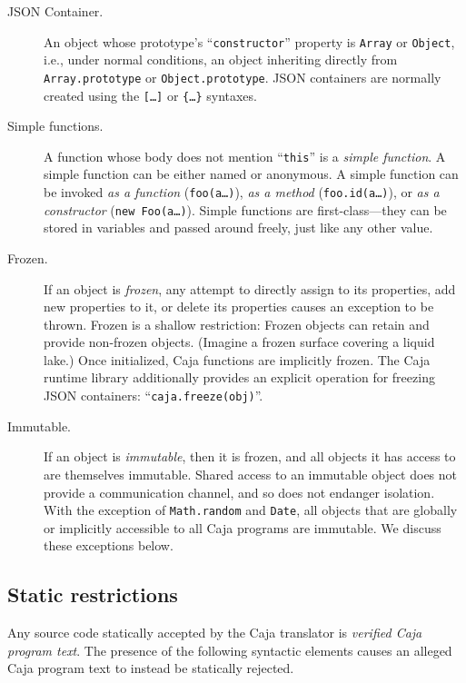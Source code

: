\documentclass[letterpaper,twocolumn,10pt]{article}
\newcommand{\code}[1]{{\tt {#1}}}              %
\begin{document}
\begin{description}

  \item[JSON Container.] An object whose prototype's ``\code{constructor}'' 
  property is \code{Array} or \code{Object}, i.e., under normal conditions, 
  an object inheriting directly from \code{Array.prototype} or 
  \code{Object.prototype}. JSON containers are normally created using the
  \code{[\ldots]} or \code{\{\ldots\}} syntaxes.

  \item[Simple functions.] A function whose body does not mention 
  ``\code{this}'' is a \emph{simple function}. A simple function can be 
  either named or anonymous. A simple function can be invoked \emph{as a 
  function} (\code{foo(a\ldots)}), \emph{as a method} 
  (\code{foo.id(a\ldots)}), or \emph{as a constructor} (\code{new 
  Foo(a\ldots)}). Simple functions are first-class---they can be stored in 
  variables and passed around freely, just like any other value.
  
  \item[Frozen.] If an object is \emph{frozen}, any attempt to directly 
  assign to its properties, add new properties to it, or delete its 
  properties causes an exception to be thrown. Frozen is a shallow 
  restriction: Frozen objects can retain and provide non-frozen objects. 
  (Imagine a frozen surface covering a liquid lake.) Once initialized, Caja 
  functions are implicitly frozen. The Caja runtime library additionally 
  provides an explicit operation for freezing JSON containers: 
  ``\code{caja.freeze(obj)}''.
  
  \item[Immutable.] If an object is \emph{immutable}, then it is frozen, and 
  all objects it has access to are themselves immutable. Shared access to an 
  immutable object does not provide a communication channel, and so does not 
  endanger isolation. With the exception of \code{Math.random} and 
  \code{Date}, all objects that are globally or implicitly accessible to all 
  Caja programs are immutable. We discuss these exceptions below.

\end{description}

\subsection{Static restrictions}

Any source code statically accepted by the Caja translator is \emph{verified 
Caja program text}. The presence of the following syntactic elements causes 
an alleged Caja program text to instead be statically rejected.
\end{document}
